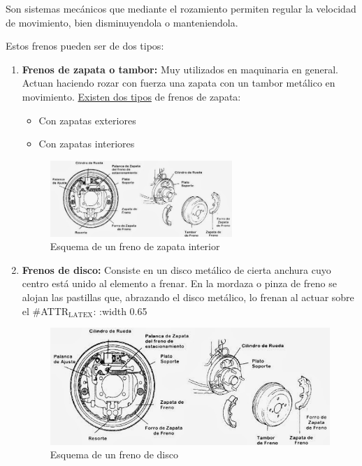 \documentclass[a4paper,12pt,oneside]{book}
\begin{document}
Son sistemas mecánicos que mediante el rozamiento permiten regular la velocidad
de movimiento, bien disminuyendola o manteniendola.

Estos frenos pueden ser de dos tipos:
\begin{enumerate}
\item \textbf{Frenos de zapata o tambor:} Muy utilizados en maquinaria en general. Actuan haciendo
rozar con fuerza una zapata con un tambor metálico en movimiento. \uline{Existen
dos tipos} de frenos de zapata: 
\begin{itemize}
\item Con zapatas exteriores
\item Con zapatas interiores
\end{itemize}
\begin{figure}[htbp]
\centering
\includegraphics[width=0.65\textwidth]{./img_0009/freno_tambor.jpg}
\caption{Esquema de un freno de zapata interior}
\end{figure}
\item \textbf{Frenos de disco:} Consiste en un disco metálico de cierta anchura cuyo
centro está unido al elemento a frenar. En la mordaza o pinza de freno se
alojan las pastillas que, abrazando el disco metálico, lo frenan al actuar
sobre el
\#ATTR\(_{\text{LATEX}}\): :width 0.65\textwidth
\begin{figure}[htbp]
\centering
\includegraphics[width=.9\linewidth]{./img_0009/freno_tambor.jpg}
\caption{Esquema de un freno de disco}
\end{figure}
\end{enumerate}

\end{document}
